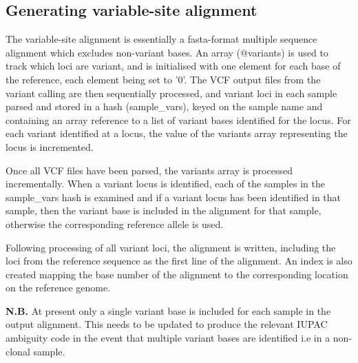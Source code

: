 \documentclass[a4paper,10pt,twoside]{article}
\begin{document}
\subsection{Generating variable-site alignment}

The variable-site alignment is essentially a fasta-format multiple sequence
alignment which excludes non-variant bases.  An array (@variants) is used to
track which loci are variant, and is initialised with one element for each base
of the reference, each element being set to '0'. The VCF output files from the
variant calling are then sequentially processed, and variant loci in each
sample parsed and stored in a hash (sample\_vars), keyed on the sample name and
containing an array reference to a list of variant bases identified for the
locus. For each variant identified at a locus, the value of the variants array
representing the locus is incremented. 

Once all VCF files have been parsed, the variants array is processed
incrementally. When a variant locus is identified, each of the samples in the
sample\_vars hash is examined and if a variant locus has been identified in
that sample, then the variant base is included in the alignment for that
sample, otherwise the corresponding reference allele is used. 

Following processing of all variant loci, the alignment is written, including
the loci from the reference sequence as the first line of the alignment. An
index is also created mapping the base number of the alignment to the
corresponding location on the reference genome.

\textbf{N.B.} At present only a single variant base is included for each sample
in the output alignment. This needs to be updated to produce the relevant IUPAC
ambiguity code in the event that multiple variant bases are identified i.e in a
non-clonal sample. 
 
\end{document}
